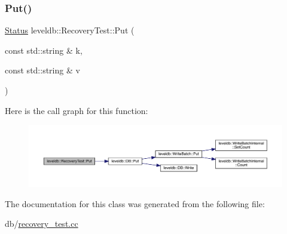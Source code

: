 \subsubsection{\texorpdfstring{Put()}{Put()}}
{\footnotesize\ttfamily \mbox{\hyperlink{classleveldb_1_1_status}{Status}} leveldb\+::\+Recovery\+Test\+::\+Put (\begin{DoxyParamCaption}\item[{const std\+::string \&}]{k,  }\item[{const std\+::string \&}]{v }\end{DoxyParamCaption})\hspace{0.3cm}{\ttfamily [inline]}}

Here is the call graph for this function\+:
\nopagebreak
\begin{figure}[H]
\begin{center}
\leavevmode
\includegraphics[width=350pt]{classleveldb_1_1_recovery_test_ad5b3e5d410f452814a0c47b195bda9ff_cgraph}
\end{center}
\end{figure}


The documentation for this class was generated from the following file\+:\begin{DoxyCompactItemize}
\item 
db/\mbox{\hyperlink{recovery__test_8cc}{recovery\+\_\+test.\+cc}}\end{DoxyCompactItemize}
